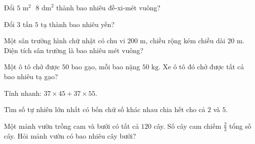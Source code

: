 \begin{ex}
  Đổi $5\text{ m}^2\text{ } 8\text{ dm}^2$ thành bao nhiêu đề-xi-mét vuông?
\end{ex}

\begin{ex}
  Đổi $3\text{ tấn } 5\text{ tạ}$ thành bao nhiêu yến?
\end{ex}

\begin{ex}
  Một sân trường hình chữ nhật có chu vi $200\text{ m}$, chiều rộng kém chiều dài $20\text{ m}$. Diện tích sân trường là bao nhiêu mét vuông?
\end{ex}

\begin{ex}
  Một ô tô chở được $50$ bao gạo, mỗi bao nặng $50\text{ kg}$. Xe ô tô đó chở được tất cả bao nhiêu tạ gạo?
\end{ex}

\begin{ex}
  Tính nhanh: $37 \times 45 + 37 \times 55$.
\end{ex}

\begin{ex}
  Tìm số tự nhiên lớn nhất có bốn chữ số khác nhau chia hết cho cả $2$ và $5$.
\end{ex}

\begin{ex}
  Một mảnh vườn trồng cam và bưởi có tất cả $120$ cây. Số cây cam chiếm $\frac{2}{3}$ tổng số cây. Hỏi mảnh vườn có bao nhiêu cây bưởi?
\end{ex}

